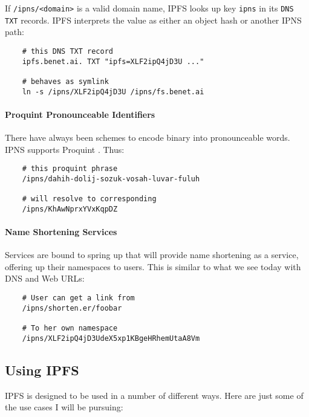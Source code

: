 \documentclass{sig-alternate}
\begin{document}
If \texttt{/ipns/<domain>} is a valid domain name, IPFS
looks up key \texttt{ipns} in its \texttt{DNS TXT} records. IPFS
interprets the value as either an object hash or another IPNS path:

\begin{verbatim}
    # this DNS TXT record
    ipfs.benet.ai. TXT "ipfs=XLF2ipQ4jD3U ..."

    # behaves as symlink
    ln -s /ipns/XLF2ipQ4jD3U /ipns/fs.benet.ai
\end{verbatim}


\paragraph{Proquint Pronounceable Identifiers}

There have always been schemes to encode binary into pronounceable words. IPNS supports Proquint \cite{Proquint}. Thus:

\begin{verbatim}
    # this proquint phrase
    /ipns/dahih-dolij-sozuk-vosah-luvar-fuluh

    # will resolve to corresponding
    /ipns/KhAwNprxYVxKqpDZ
\end{verbatim}

\paragraph{Name Shortening Services}

Services are bound to spring up that will provide name shortening as a service, offering up their namespaces to users. This is similar to what we see today with DNS and Web URLs:

\begin{verbatim}
    # User can get a link from
    /ipns/shorten.er/foobar

    # To her own namespace
    /ipns/XLF2ipQ4jD3UdeX5xp1KBgeHRhemUtaA8Vm
\end{verbatim}

\subsection{Using IPFS}

IPFS is designed to be used in a number of different ways. Here are just some of the use cases I will be pursuing:
\end{document}
